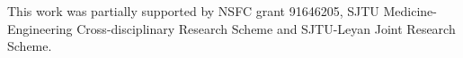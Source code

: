 \documentclass[sigconf]{acmart}
\begin{document}



\maketitle


	
	
	
	
	




\begin{acks}
This work was partially supported by NSFC grant 91646205, SJTU Medicine-Engineering Cross-disciplinary Research Scheme and SJTU-Leyan Joint Research Scheme.
\end{acks}

%
%



\end{document}
